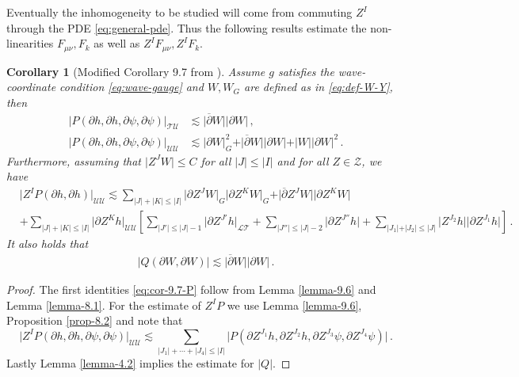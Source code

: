 \documentclass[11pt, a4paper]{amsart}
\numberwithin{equation}{section}
\newtheorem{corollary}[theorem]{Corollary}
\numberwithin{theorem}{section}
\newcommand{\p}{\partial}
\newcommand{\mn}{{\mu \nu}}
\newcommand{\pgood}{\overline{\partial}}
\newcommand{\UU}{{\mathcal{U} \mathcal{U}}}
\newcommand{\TU}{{\mathcal{T} \mathcal{U}}}
\newcommand{\LT}{{\mathcal{L} \mathcal{T}}}
\newcommand{\I}{\vert I \vert}
\newcommand{\J}{\vert J \vert}
\begin{document}
Eventually the inhomogeneity to be studied will come from commuting $Z^I$ through the PDE \eqref{eq:general-pde}. Thus the following results estimate the non-linearities $F_\mn, F_k$ as well as $Z^I F_\mn, Z^I F_k$. 
\begin{corollary}[Modified Corollary 9.7 from \cite{LR:04}] \label{corol-9.7}
Assume $g$ satisfies the wave-coordinate condition \eqref{eq:wave-gauge} and $W, W_G$ are defined as in \eqref{eq:def-W-Y}, then
\begin{equation} \begin{split} 
\vert P (\p h, \p h, \p \psi, \p \psi ) \vert_\TU & \lesssim \vert \pgood W \vert \vert \p W \vert \,, \\
\vert P (\p h, \p h, \p \psi, \p \psi) \vert_\UU &\lesssim \vert \p W \vert_G^2 + \vert \pgood W \vert \vert \p W \vert + \vert W \vert \vert \p W \vert^2 \,. \label{eq:cor-9.7-P}
\end{split} \end{equation}
Furthermore, assuming that $\vert Z^J W \vert \leq C$ for all $\J \leq \I$ and for all $Z \in \mathcal{Z}$, we have
\begin{align*}
& \vert Z^I P (\p h, \p h) \vert_\UU
\lesssim  \sum_{\J + |K| \leq \I} \vert \p Z^J W \vert_G \vert \p Z^K W \vert_G  + \vert \pgood Z^J W \vert \vert \p Z^K W \vert \\
&  + \sum_{\J + |K|  \leq \I} \vert \p Z^K h \vert_\UU \left[ \sum_{\vert J'\vert \leq \vert J\vert -1} \vert \p Z^{J'} h \vert_\LT + \sum_{\vert J'' \vert \leq \J -2 } \vert \p Z^{J''} h \vert + \sum_{\vert J_1 \vert + \vert J_2 \vert \leq \J} \vert Z^{J_2} h \vert \vert \p Z^{J_1} h \vert \right] \,.
\end{align*}
It also holds that
\begin{align*}
\vert Q( \p W, \p W) \vert \lesssim \vert \pgood W \vert \vert \p W \vert  \,.
\end{align*}
\end{corollary}
\begin{proof}
The first identities \eqref{eq:cor-9.7-P} follow from Lemma \ref{lemma-9.6} and Lemma \ref{lemma-8.1}. For the estimate of $Z^I P$ we use Lemma \ref{lemma-9.6}, Proposition \ref{prop-8.2} and note that
$$ \vert Z^I P (\p h, \p h, \p \psi, \p \psi ) \vert_\UU \lesssim \sum_{| J_1| + \cdots+| J_4| \leq \I} \vert P ( \p Z^{J_1} h, \p Z^{J_2} h, \p Z^{J_3} \psi, \p Z^{J_4} \psi ) \vert \,. $$
Lastly Lemma \ref{lemma-4.2} implies the estimate for $\vert Q \vert$. 
\end{proof}
\end{document}
